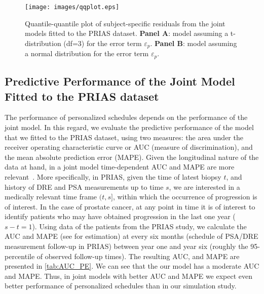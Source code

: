 \begin{figure}[!htb]
\centerline{\texttt{[image: images/qqplot.eps]}}
\caption{Quantile-quantile plot of subject-specific residuals from the joint models fitted to the PRIAS dataset. \textbf{Panel A}: model assuming a t-distribution (df=3) for the error term $\varepsilon_p$. \textbf{Panel B}: model assuming a normal distribution for the error term $\varepsilon_p$.}
\label{fig:qqplot}
\end{figure}

\clearpage
\subsection{Predictive Performance of the Joint Model Fitted to the PRIAS dataset}
The performance of personalized schedules depends on the performance of the joint model. In this regard, we evaluate the predictive performance of the model that we fitted to the PRIAS dataset, using two measures: the area under the receiver operating characteristic curve or AUC (measure of discrimination), and the mean absolute prediction error (MAPE). Given the longitudinal nature of the data at hand, in a joint model time-dependent AUC and MAPE are more relevant~\citep{landmarking2017}. More specifically, in PRIAS, given the time of latest biopsy $t$, and history of DRE and PSA measurements up to time $s$, we are interested in a medically relevant time frame $(t, s]$, within which the occurrence of progression is of interest. In the case of prostate cancer, at any point in time it is of interest to identify patients who may have obtained progression in the last one year ($s-t = 1$). Using data of the patients from the PRIAS study, we calculate the AUC and MAPE (see \citet{landmarking2017} for estimation) at every six months (schedule of PSA/DRE measurement follow-up in PRIAS) between year one and year six (roughly the 95-percentile of observed follow-up times). The resulting AUC, and MAPE are presented in \ref{tab:AUC_PE}. We can see that the our model has a moderate AUC and MAPE. Thus, in joint models with better AUC and MAPE we expect even better performance of personalized schedules than in our simulation study.

